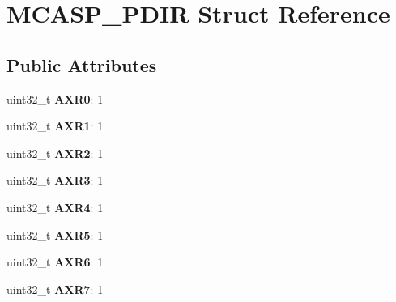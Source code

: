 \hypertarget{structMCASP__PDIR}{\section{M\-C\-A\-S\-P\-\_\-\-P\-D\-I\-R Struct Reference}
\label{structMCASP__PDIR}
}
\subsection*{Public Attributes}
\begin{DoxyCompactItemize}
\item 
\hypertarget{structMCASP__PDIR_a0c6850bb556688e81186e2a40e7c870f}{uint32\-\_\-t {\bfseries A\-X\-R0}\-: 1}\label{structMCASP__PDIR_a0c6850bb556688e81186e2a40e7c870f}

\item 
\hypertarget{structMCASP__PDIR_a54db0f340d2df2490bdb59a0eb2cb927}{uint32\-\_\-t {\bfseries A\-X\-R1}\-: 1}\label{structMCASP__PDIR_a54db0f340d2df2490bdb59a0eb2cb927}

\item 
\hypertarget{structMCASP__PDIR_a70417f0acad44d73ec6ab7e6b125f478}{uint32\-\_\-t {\bfseries A\-X\-R2}\-: 1}\label{structMCASP__PDIR_a70417f0acad44d73ec6ab7e6b125f478}

\item 
\hypertarget{structMCASP__PDIR_a1f678063315a9683b3b248dc8a97ac3f}{uint32\-\_\-t {\bfseries A\-X\-R3}\-: 1}\label{structMCASP__PDIR_a1f678063315a9683b3b248dc8a97ac3f}

\item 
\hypertarget{structMCASP__PDIR_ae46375e11d4ae3cdedfe589bb5144b9b}{uint32\-\_\-t {\bfseries A\-X\-R4}\-: 1}\label{structMCASP__PDIR_ae46375e11d4ae3cdedfe589bb5144b9b}

\item 
\hypertarget{structMCASP__PDIR_aa7d4c3305397124c7da06d7e0bc051a8}{uint32\-\_\-t {\bfseries A\-X\-R5}\-: 1}\label{structMCASP__PDIR_aa7d4c3305397124c7da06d7e0bc051a8}

\item 
\hypertarget{structMCASP__PDIR_a20cc7915d07703fd16cc07adf68f2ed2}{uint32\-\_\-t {\bfseries A\-X\-R6}\-: 1}\label{structMCASP__PDIR_a20cc7915d07703fd16cc07adf68f2ed2}

\item 
\hypertarget{structMCASP__PDIR_a3a4c902fecd4fd852679ddaa35825e77}{uint32\-\_\-t {\bfseries A\-X\-R7}\-: 1}\label{structMCASP__PDIR_a3a4c902fecd4fd852679ddaa35825e77}


\end{DoxyCompactItemize}
